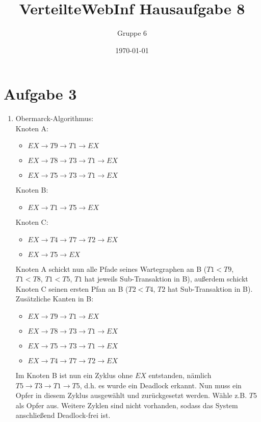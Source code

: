 \documentclass[a4paper]{article}
\author{Gruppe 6}
\title{\textbf{VerteilteWebInf Hausaufgabe 8}}
\date{\today}
\begin{document}
\maketitle


\section*{Aufgabe 3}
\begin{enumerate}[label=\alph*)]
\item Obermarck-Algorithmus:\\
Knoten A: 
\begin{itemize}
\item $EX\rightarrow T9\rightarrow T1 \rightarrow EX$
\item $EX\rightarrow T8\rightarrow T3 \rightarrow T1 \rightarrow EX$
\item $EX\rightarrow T5\rightarrow T3 \rightarrow T1 \rightarrow EX$
\end{itemize}
Knoten B: 
\begin{itemize}
\item $EX\rightarrow T1\rightarrow T5 \rightarrow EX$
\end{itemize}
Knoten C: 
\begin{itemize}
\item $EX\rightarrow T4\rightarrow T7 \rightarrow T2 \rightarrow EX$
\item $EX\rightarrow  T5 \rightarrow EX$
\end{itemize}
Knoten A schickt nun alle Pfade seines Wartegraphen an B ($T1<T9$, $T1<T8$, $T1<T5$, $T1$ hat jeweils Sub-Transaktion in B), außerdem schickt Knoten C seinen ersten Pfan an B ($T2<T4$, $T2$ hat Sub-Transaktion in B). Zusätzliche Kanten in B:
\begin{itemize}
\item $EX\rightarrow T9\rightarrow T1 \rightarrow EX$
\item $EX\rightarrow T8\rightarrow T3 \rightarrow T1 \rightarrow EX$
\item $EX\rightarrow T5\rightarrow T3 \rightarrow T1 \rightarrow EX$
\item $EX\rightarrow T4\rightarrow T7 \rightarrow T2 \rightarrow EX$
\end{itemize}
Im Knoten B ist nun ein Zyklus ohne $EX$ entstanden, nämlich $T5\rightarrow T3\rightarrow T1 \rightarrow T5$, d.h. es wurde ein Deadlock erkannt. Nun muss ein Opfer in diesem Zyklus ausgewählt und zurückgesetzt werden. Wähle z.B. $T5$ als Opfer aus. Weitere Zyklen sind nicht vorhanden, sodass das System anschließend Deadlock-frei ist.
\end{enumerate}
\end{document}
